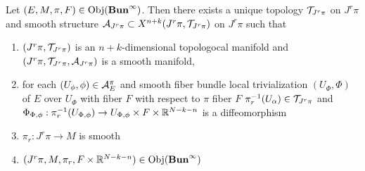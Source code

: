 \documentclass{book}
\begin{document}
\begin{ex}
	Let $(E, M, \pi, F) \in \operatorname{Obj}(\operatorname*{\text{\textbf{Bun}}^{\infty}})$. Then there exists a unique topology $\mathcal{T}_{J^r \pi}$ on $J^r \pi$ and smooth structure $\mathcal{A}_{J^r \pi} \subset X^{n+k}(J^r \pi, \mathcal{T}_{J^r \pi})$ on $J^r \pi$ such that
	\begin{enumerate}
		\item $(J^r \pi, \mathcal{T}_{J^r \pi})$ is an $n+k$-dimensional topologocal manifold and $(J^r \pi, \mathcal{T}_{J^r \pi}, \mathcal{A}_{J^r \pi})$ is a smooth manifold,
		\item for each $(U_{\phi}, \phi) \in \mathcal{A}_E^{\pi}$ and smooth fiber bundle local trivialization $(U_{\Phi}, \Phi)$ of $E$ over $U_{\Phi}$ with fiber $F$ with respect to $\pi$ fiber $F$  $ \pi_r^{-1}(U_{\alpha}) \in \mathcal{T}_{J^r \pi}$ and $\Phi_{\Phi, \phi}: \pi_r^{-1}(U_{\Phi, \phi}) \rightarrow U_{\Phi, \phi} \times F \times \mathbb{R}^{N-k-n}$ is a diffeomorphism
		\item $\pi_r: J^r \pi \rightarrow M$ is smooth
		\item $(J^r \pi, M, \pi_r, F \times \mathbb{R}^{N-k-n}) \in \operatorname{Obj}(\operatorname*{\text{\textbf{Bun}}^{\infty}})$ 
	\end{enumerate}
\end{ex}
\end{document}
